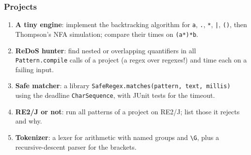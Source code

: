 \documentclass[aspectratio=169,10pt,compress]{beamer}
\begin{document}
\begin{frame}[t,fragile] \frametitle{Projects}
  \begin{enumerate}\small
    \item \textbf{A tiny engine}: implement the backtracking algorithm for \texttt{a}, \texttt{.}, \texttt{*}, \texttt{|}, \texttt{()}, then Thompson's NFA simulation; compare their times on \texttt{(a*)*b}.
    \item \textbf{ReDoS hunter}: find nested or overlapping quantifiers in all \texttt{Pattern.compile} calls of a project (a regex over regexes!) and time each on a failing input.
    \item \textbf{Safe matcher}: a library \texttt{SafeRegex.matches(pattern, text, millis)} using the deadline \texttt{CharSequence}, with JUnit tests for the timeout.
    \item \textbf{RE2/J or not}: run all patterns of a project on RE2/J; list those it rejects and why.
    \item \textbf{Tokenizer}: a lexer for arithmetic with named groups and \texttt{\textbackslash G}, plus a recursive-descent parser for the brackets.
  \end{enumerate}
\end{frame}




\begin{frame}[t,fragile]
	\begin{center}
		\vspace{4cm}
	\end{center}
\end{frame}
\end{document}
